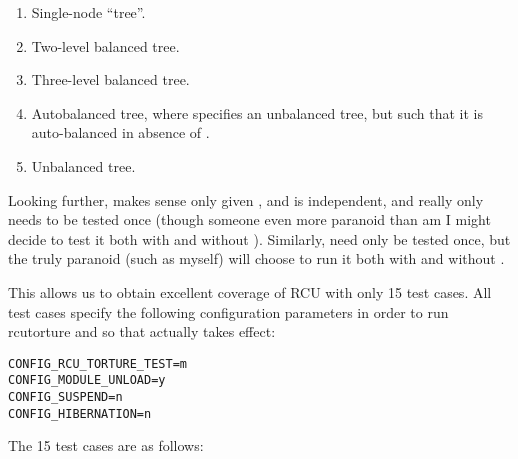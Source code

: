 \begin{enumerate}
\item	Single-node ``tree''.
\item	Two-level balanced tree.
\item	Three-level balanced tree.
\item	Autobalanced tree, where 
	specifies an unbalanced tree, but such that it is auto-balanced
	in absence of .
\item	Unbalanced tree.
\end{enumerate}

Looking further,  makes sense only
given , and 
is independent, and really only needs to be tested once (though someone
even more paranoid than am I might decide to test it both with
and without ).
Similarly,  need only be tested once,
but the truly paranoid (such as myself) will choose to run it both with
and without .

This allows us to obtain excellent coverage of RCU with only 15
test cases.
All test cases specify the following configuration parameters in order
to run rcutorture and so that  actually
takes effect:

\vspace{5pt}
\begin{minipage}[t]{\columnwidth}
\scriptsize
\begin{verbatim}
CONFIG_RCU_TORTURE_TEST=m
CONFIG_MODULE_UNLOAD=y
CONFIG_SUSPEND=n
CONFIG_HIBERNATION=n
\end{verbatim}
\end{minipage}
\vspace{5pt}

The 15 test cases are as follows:

